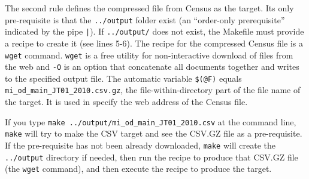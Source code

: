 The second rule defines the compressed file from Census as the target.
Its only pre-requisite is that the \texttt{../output} folder exist
(an ``order-only prerequisite'' indicated by the pipe \texttt{|}).
If \texttt{../output/} does not exist, the Makefile must provide a recipe to create it
(see lines 5-6).
The recipe for the compressed Census file is a \texttt{wget} command.
\texttt{wget} is a free utility for non-interactive download of files from the web
and \texttt{-O} is an option that concatenate all documents together and writes to the specified output file.
The automatic variable \texttt{\$(@F)} equals \texttt{mi\_od\_main\_JT01\_2010.csv.gz},
the file-within-directory part of the file name of the target.
It is used in specify the web address of the Census file.

If you type \texttt{make ../output/mi\_od\_main\_JT01\_2010.csv} at the command line, \texttt{make} will try to make the CSV target and see the CSV.GZ file as a pre-requisite.
If the pre-requisite has not been already downloaded, \texttt{make} will create the \texttt{../output} directory if needed,
then run the recipe to produce that CSV.GZ file (the \texttt{wget} command),
and then execute the recipe to produce the target.

